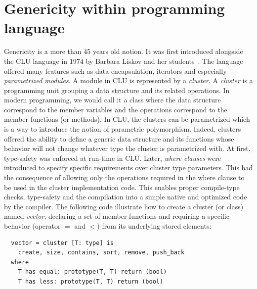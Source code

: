 

\section{Genericity within programming language}
\label{sec:gen.genericity.within.programming.languages}

Genericity is a more than 45 years old notion. It was first introduced alongside the CLU language in 1974 by Barbara
Liskov and her students~\parencite{liskov.1993.cluart}. The language offered many features such as data encapsulation,
iterators and especially \emph{parametrized modules}. A module in CLU is represented by a \emph{cluster}. A
\emph{cluster} is a programming unit grouping a data structure and its related operations. In modern programming, we
would call it a class where the data structure correspond to the member variables and the operations correspond to the
member functions (or methods). In CLU, the clusters can be parametrized which is a way to introduce the notion of
parametric polymorphism. Indeed, clusters offered the ability to define a generic data structure and its functions whose
behavior will not change whatever type the cluster is parametrized with. At first, type-safety was enforced at run-time
in CLU. Later, \emph{where clauses} were introduced to specify specific requirements over cluster type parameters. This
had the consequence of allowing only the operations required in the where clause to be used in the cluster
implementation code. This enables proper compile-type checks, type-safety and the compilation into a simple native and
optimized code by the compiler. The following code illustrate how to create a cluster (or class) named \emph{vector},
declaring a set of member functions and requiring a specific behavior (operator $=$ and $<$) from its underlying stored
elements:

\begin{verbatim}
  vector = cluster [T: type] is
    create, size, contains, sort, remove, push_back
  where
    T has equal: prototype(T, T) return (bool)
    T has less: prototype(T, T) return (bool)
\end{verbatim}

